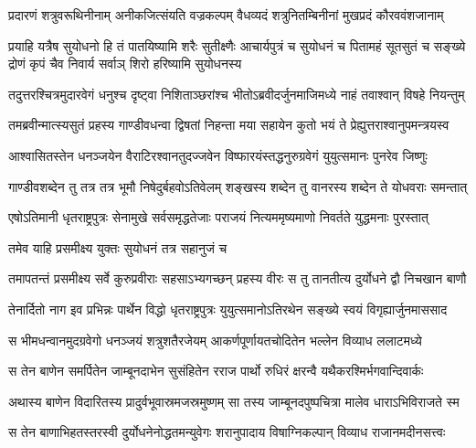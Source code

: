 \fourlineindentedshloka
{प्रदारणं शत्रुवरूथिनीनाम्}
{अनीकजित्संयति वज्रकल्पम्}
{वैधव्यदं शत्रुनितम्बिनीनां}
{मुखप्रदं कौरववंशजानाम्}


\sixlineindentedshloka
{प्रयाहि यत्रैष सुयोधनो हि}
{तं पातयिष्यामि शरैः सुतीक्ष्णैः}
{आचार्यपुत्रं च सुयोधनं च}
{पितामहं सूतसुतं च सङ्ख्ये}
{द्रोणं कृपं चैव निवार्य सर्वाञ्}
{शिरो हरिष्यामि सुयोधनस्य}



\fourlineindentedshloka
{तदुत्तरश्चित्रमुदारवेगं}
{धनुश्च दृष्ट्वा निशिताञ्छरांश्च}
{भीतोऽब्रवीदर्जुनमाजिमध्ये}
{नाहं तवाश्वान् विषहे नियन्तुम्}


\fourlineindentedshloka
{तमब्रवीन्मात्स्यसुतं प्रहस्य}
{गाण्डीवधन्वा द्विषतां निहन्ता}
{मया सहायेन कुतो भयं ते}
{प्रेह्युत्तराश्वानुपमन्त्रयस्व}


\fourlineindentedshloka
{आश्वासितस्तेन धनञ्जयेन}
{वैराटिरश्वानतुदज्जवेन}
{विष्फारयंस्तद्धनुरुग्रवेगं}
{युयुत्समानः पुनरेव जिष्णुः}


\fourlineindentedshloka
{गाण्डीवशब्देन तु तत्र तत्र}
{भूमौ निषेदुर्बहवोऽतिवेलम्}
{शङ्खस्य शब्देन तु वानरस्य}
{शब्देन ते योधवराः समन्तात्}



\fourlineindentedshloka
{एषोऽतिमानी धृतराष्ट्रपुत्रः}
{सेनामुखे सर्वसमृद्धतेजाः}
{पराजयं नित्यममृष्यमाणो}
{निवर्तते युद्धमनाः पुरस्तात्}


\onelineindentedshloka
{तमेव याहि प्रसमीक्ष्य युक्तः}
{सुयोधनं तत्र सहानुजं च}



\fourlineindentedshloka
{तमापतन्तं प्रसमीक्ष्य सर्वे}
{कुरुप्रवीराः सहसाऽभ्यगच्छन्}
{प्रहस्य वीरः स तु तानतीत्य}
{दुर्योधने द्वौ निचखान बाणौ}


\fourlineindentedshloka
{तेनार्दितो नाग इव प्रभिन्नः}
{पार्थेन विद्धो धृतराष्ट्रपुत्रः}
{युयुत्समानोऽतिरथेन सङ्ख्ये}
{स्वयं विगृह्यार्जुनमाससाद}


\fourlineindentedshloka
{स भीमधन्वानमुदग्रवेगो}
{धनञ्जयं शत्रुशतैरजेयम्}
{आकर्णपूर्णायतचोदितेन}
{भल्लेन विव्याध ललाटमध्ये}


\fourlineindentedshloka
{स तेन बाणेन समर्पितेन}
{जाम्बूनदाभेन सुसंहितेन}
{रराज पार्थो रुधिरं क्षरन्वै}
{यथैकरश्मिर्भगवान्दिवार्कः}


\fourlineindentedshloka
{अथास्य बाणेन विदारितस्य}
{प्रादुर्वभूवास्रमजस्रमुष्णम्}
{सा तस्य जाम्बूनदपुष्पचित्रा}
{मालेव धाराऽभिविराजते स्म}


\fourlineindentedshloka
{स तेन बाणाभिहतस्तरस्वी}
{दुर्योधनेनोद्धतमन्युवेगः}
{शरानुपादाय विषाग्निकल्पान्}
{विव्याध राजानमदीनसत्त्वः}


